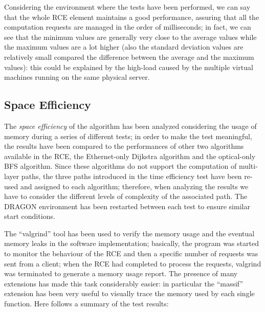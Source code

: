 \documentclass[10pt,a4paper]{report}
\begin{document}
Considering the environment where the tests have been performed, we
can say that the whole RCE element maintains a good performance,
assuring that all the computation requests are managed in the order of
milliseconds; in fact, we can see that the minimum values are
generally very close to the average values while the maximum values
are a lot higher (also the standard deviation values are relatively
small compared the difference between the average and the maximum
values): this could be explained by the high-load caused by the
multiple virtual machines running on the same physical server.

\subsection{Space Efficiency}

The \textit{space efficiency} of the algorithm has been analyzed
considering the usage of memory during a series of different tests; in
order to make the test meaningful, the results have been compared to
the performances of other two algorithms available in the RCE, the
Ethernet-only Dijkstra algorithm and the optical-only BFS
algorithm. Since these algorithms do not support the computation of
multi-layer paths, the three paths introduced in the time efficiency
test have been re-used and assigned to each algorithm; therefore, when
analyzing the results we have to consider the different levels of
complexity of the associated path. The DRAGON environment has been
restarted between each test to ensure similar start conditions.

The ``valgrind'' tool has been used to verify the memory usage and the
eventual memory leaks in the software implementation; basically, the
program was started to monitor the behaviour of the RCE and then a
specific number of requests was sent from a client; when the RCE had
completed to process the requests, valgrind was terminated to generate
a memory usage report. The presence of many extensions has made this
task considerably easier: in particular the ``massif'' extension has
been very useful to visually trace the memory used by each single
function. Here follows a summary of the test results:
\end{document}
